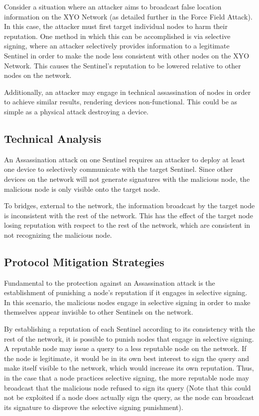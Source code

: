 \documentclass{article}
\begin{document}
Consider a situation where an attacker aims to broadcast false location information on the XYO Network (as detailed further in the Force Field Attack). In this case, the attacker must first target individual nodes to harm their reputation. One method in which this can be accomplished is via selective signing, where an attacker selectively provides information to a legitimate Sentinel in order to make the node less consistent with other nodes on the XYO Network. This causes the Sentinel's reputation to be lowered relative to other nodes on the network.

Additionally, an attacker may engage in technical assassination of nodes in order to achieve similar results, rendering devices non-functional. This could be as simple as a physical attack destroying a device.

\subsection{Technical Analysis}

An Assassination attack on one Sentinel requires an attacker to deploy at least one device to selectively communicate with the target Sentinel. Since other devices on the network will not generate signatures with the malicious node, the malicious node is only visible onto the target node.

To \gls{bridge}s, external to the network, the information broadcast by the target node is inconsistent with the rest of the network. This has the effect of the target node losing reputation with respect to the rest of the network, which are consistent in not recognizing the malicious node.

\subsection{Protocol Mitigation Strategies}

Fundamental to the protection against an Assassination attack is the establishment of punishing a node's reputation if it engages in selective signing. In this scenario, the malicious nodes engage in selective signing in order to make themselves appear invisible to other Sentinels on the network.

By establishing a reputation of each Sentinel according to its consistency with the rest of the network, it is possible to punish nodes that engage in selective signing. A reputable node may issue a query to a less reputable node on the network. If the node is legitimate, it would be in its own best interest to sign the query and make itself visible to the network, which would increase its own reputation. Thus, in the case that a node practices selective signing, the more reputable node may broadcast that the malicious node refused to sign its query (Note that this could not be exploited if a node does actually sign the query, as the node can broadcast its signature to disprove the selective signing punishment).
\end{document}
